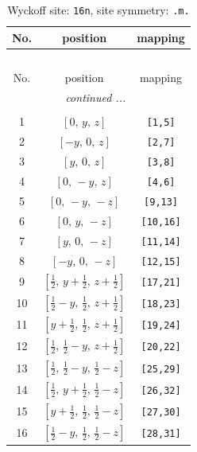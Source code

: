 \documentclass[fleqn,8pt]{jsarticle}
\begin{document}
\renewcommand{\arraystretch}{1.2}
\begin{longtable}{ccc}
\caption{Wyckoff site: {\tt 16n}, site symmetry: {\tt .m.}}
 \\
 \hline \hline
No. & position & mapping \\ \hline \endfirsthead

\multicolumn{2}{l}{\tablename\ \thetable{}} \\
 \hline \hline
No. & position & mapping \\ \hline \endhead

 \hline \hline
\multicolumn{2}{r}{\footnotesize\it continued ...} \\ \endfoot

 \hline \hline
\multicolumn{2}{r}{} \\ \endlastfoot

1 & $\left[ 0,\, y,\, z \right]$ & {\tt [1,5]} \\ \hline
2 & $\left[ - y,\, 0,\, z \right]$ & {\tt [2,7]} \\ \hline
3 & $\left[ y,\, 0,\, z \right]$ & {\tt [3,8]} \\ \hline
4 & $\left[ 0,\, - y,\, z \right]$ & {\tt [4,6]} \\ \hline
5 & $\left[ 0,\, - y,\, - z \right]$ & {\tt [9,13]} \\ \hline
6 & $\left[ 0,\, y,\, - z \right]$ & {\tt [10,16]} \\ \hline
7 & $\left[ y,\, 0,\, - z \right]$ & {\tt [11,14]} \\ \hline
8 & $\left[ - y,\, 0,\, - z \right]$ & {\tt [12,15]} \\ \hline
9 & $\left[ \frac{1}{2},\, y + \frac{1}{2},\, z + \frac{1}{2} \right]$ & {\tt [17,21]} \\ \hline
10 & $\left[ \frac{1}{2} - y,\, \frac{1}{2},\, z + \frac{1}{2} \right]$ & {\tt [18,23]} \\ \hline
11 & $\left[ y + \frac{1}{2},\, \frac{1}{2},\, z + \frac{1}{2} \right]$ & {\tt [19,24]} \\ \hline
12 & $\left[ \frac{1}{2},\, \frac{1}{2} - y,\, z + \frac{1}{2} \right]$ & {\tt [20,22]} \\ \hline
13 & $\left[ \frac{1}{2},\, \frac{1}{2} - y,\, \frac{1}{2} - z \right]$ & {\tt [25,29]} \\ \hline
14 & $\left[ \frac{1}{2},\, y + \frac{1}{2},\, \frac{1}{2} - z \right]$ & {\tt [26,32]} \\ \hline
15 & $\left[ y + \frac{1}{2},\, \frac{1}{2},\, \frac{1}{2} - z \right]$ & {\tt [27,30]} \\ \hline
16 & $\left[ \frac{1}{2} - y,\, \frac{1}{2},\, \frac{1}{2} - z \right]$ & {\tt [28,31]} \\
\end{longtable}
\end{document}
